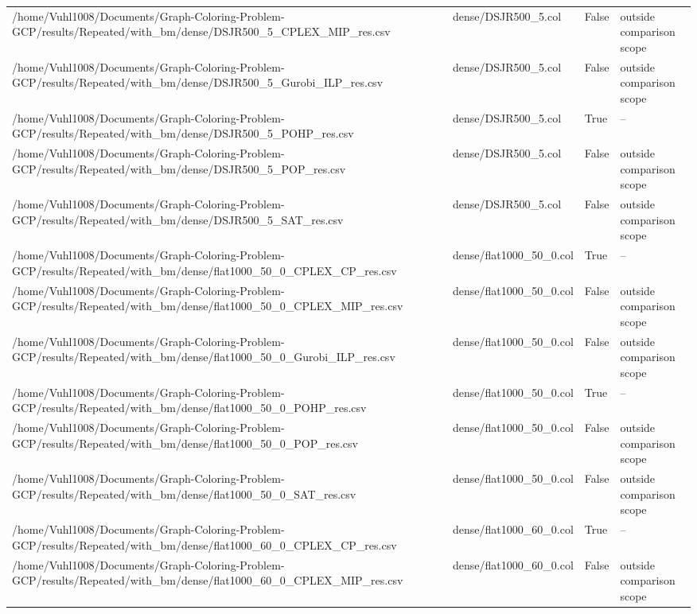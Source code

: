 \begin{table}[htbp]
\begin{tabular}{llll}
/home/Vuhl1008/Documents/Graph-Coloring-Problem-GCP/results/Repeated/with\_bm/dense/DSJR500\_5\_CPLEX\_MIP\_res.csv & dense/DSJR500\_5.col & False & outside comparison scope \\
/home/Vuhl1008/Documents/Graph-Coloring-Problem-GCP/results/Repeated/with\_bm/dense/DSJR500\_5\_Gurobi\_ILP\_res.csv & dense/DSJR500\_5.col & False & outside comparison scope \\
/home/Vuhl1008/Documents/Graph-Coloring-Problem-GCP/results/Repeated/with\_bm/dense/DSJR500\_5\_POHP\_res.csv & dense/DSJR500\_5.col & True & -- \\
/home/Vuhl1008/Documents/Graph-Coloring-Problem-GCP/results/Repeated/with\_bm/dense/DSJR500\_5\_POP\_res.csv & dense/DSJR500\_5.col & False & outside comparison scope \\
/home/Vuhl1008/Documents/Graph-Coloring-Problem-GCP/results/Repeated/with\_bm/dense/DSJR500\_5\_SAT\_res.csv & dense/DSJR500\_5.col & False & outside comparison scope \\
/home/Vuhl1008/Documents/Graph-Coloring-Problem-GCP/results/Repeated/with\_bm/dense/flat1000\_50\_0\_CPLEX\_CP\_res.csv & dense/flat1000\_50\_0.col & True & -- \\
/home/Vuhl1008/Documents/Graph-Coloring-Problem-GCP/results/Repeated/with\_bm/dense/flat1000\_50\_0\_CPLEX\_MIP\_res.csv & dense/flat1000\_50\_0.col & False & outside comparison scope \\
/home/Vuhl1008/Documents/Graph-Coloring-Problem-GCP/results/Repeated/with\_bm/dense/flat1000\_50\_0\_Gurobi\_ILP\_res.csv & dense/flat1000\_50\_0.col & False & outside comparison scope \\
/home/Vuhl1008/Documents/Graph-Coloring-Problem-GCP/results/Repeated/with\_bm/dense/flat1000\_50\_0\_POHP\_res.csv & dense/flat1000\_50\_0.col & True & -- \\
/home/Vuhl1008/Documents/Graph-Coloring-Problem-GCP/results/Repeated/with\_bm/dense/flat1000\_50\_0\_POP\_res.csv & dense/flat1000\_50\_0.col & False & outside comparison scope \\
/home/Vuhl1008/Documents/Graph-Coloring-Problem-GCP/results/Repeated/with\_bm/dense/flat1000\_50\_0\_SAT\_res.csv & dense/flat1000\_50\_0.col & False & outside comparison scope \\
/home/Vuhl1008/Documents/Graph-Coloring-Problem-GCP/results/Repeated/with\_bm/dense/flat1000\_60\_0\_CPLEX\_CP\_res.csv & dense/flat1000\_60\_0.col & True & -- \\
/home/Vuhl1008/Documents/Graph-Coloring-Problem-GCP/results/Repeated/with\_bm/dense/flat1000\_60\_0\_CPLEX\_MIP\_res.csv & dense/flat1000\_60\_0.col & False & outside comparison scope \\

\end{tabular}
\end{table}
